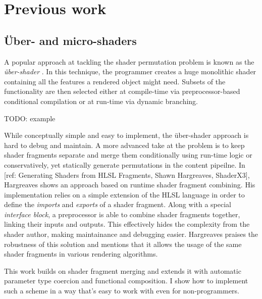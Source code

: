 
\chapter{ Previous work }
\label{Chapter3}

\section{Über- and micro-shaders}

A popular approach at tackling the shader permutation problem is known as the \emph{ über-shader }. In this technique, the programmer creates a huge monolithic shader containing all the features a rendered object might need. Subsets of the functionality are then selected either at compile-time via preprocessor-based conditional compilation or at run-time via dynamic branching.

TODO: example

While conceptually simple and easy to implement, the über-shader approach is hard to debug and maintain. A more advanced take at the problem is to keep shader fragments separate and merge them conditionally using run-time logic or conservatively, yet statically generate permutations in the content pipeilne. In [ref: Generating Shaders from HLSL Fragments, Shawn Hargreaves, ShaderX3], Hargreaves shows an approach based on runtime shader fragment combining. His implementation relies on a simple extension of the HLSL language in order to define the \emph{imports} and \emph{exports} of a shader fragment. Along with a special \emph{interface block}, a preprocessor is able to combine shader fragments together, linking their inputs and outputs. This effectively hides the complexity from the shader author, making maintainance and debugging easier. Hargreaves praises the robustness of this solution and mentions that it allows the usage of the same shader fragments in various rendering algorithms.

This work builds on shader fragment merging and extends it with automatic parameter type coercion and functional composition. I show how to implement such a scheme in a way that's easy to work with even for non-programmers.


